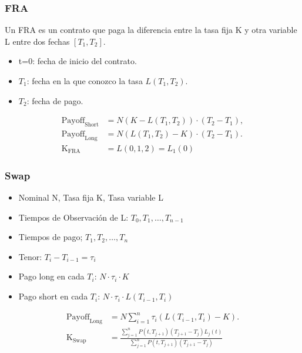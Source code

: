 \begin{frame}
    \frametitle{FRA}
    \begin{defin}[FRA]
        Un FRA es un contrato que paga la diferencia entre la tasa fija K y otra variable L entre dos fechas $[T_1,T_2]$.
        \begin{itemize}
            \item t=0: fecha de inicio del contrato.
            \item $T_1$: fecha en la que conozco la tasa $L(T_1,T_2)$.
            \item $T_2$: fecha de pago.
        \end{itemize}
        \begin{align*}
            \text{Payoff}_{\text{Short}} &= N (K - L(T_1,T_2)) \cdot (T_2 - T_1), \\
            \text{Payoff}_{\text{Long}} &= N (L(T_1,T_2) - K) \cdot (T_2 - T_1). \\
            \text{K}_\text{FRA} &= L(0, 1, 2) = L_1(0)
        \end{align*}
    \end{defin}
\end{frame}


\begin{frame}
    \frametitle{Swap}
    \begin{defin}[Swap]
        \begin{itemize}
            \item Nominal N, Tasa fija K, Tasa variable L
            \item Tiempos de Observación de L: $T_0, T_1, \ldots, T_{n-1}$
            \item Tiempos de pago; $T_1, T_2, \ldots, T_{n}$
            \item Tenor: $T_i - T_{i-1}= \tau_i$
            \item Pago long en cada $T_i$: $N\cdot \tau_i \cdot K$
            \item Pago short en cada $T_i$: $N\cdot \tau_i \cdot L(T_{i-1}, T_i)$
        \end{itemize}
        \begin{align*}
            \text{Payoff}_{\text{Long}} &= N \sum_{i=1}^n \tau_i (L(T_{i-1}, T_i) - K). \\
            \text{K}_\text{Swap} &= \frac{\sum_{j=1}^n P(t, T_{j+1}) (T_{j+1} - T_j) L_j(t)}{\sum_{j=1}^n P(t, T_{j+1}) (T_{j+1} - T_j)}
        \end{align*}
    \end{defin}
\end{frame}

